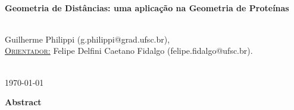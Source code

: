 \documentclass[a4paper,12pt]{article}
\begin{document}
\begin{titlepage}
		
		
		\HRule \\[0.4cm]
		{ \LARGE \bfseries \textbf{Geometria de Distâncias: uma aplicação na Geometria de Proteínas}} \\ [0.4cm] %
		\HRule \\[2.5cm]
		
		
		\begin{minipage}{1\textwidth}
			\begin{center} \large
				Guilherme Philippi (g.philippi@grad.ufsc.br),
				\vspace{0.5cm}
				\\
				\underline{\textsc{Orientador:}} \vspace{0.2cm}
				Felipe Delfini Caetano Fidalgo (felipe.fidalgo@ufsc.br).
			\end{center}
		\end{minipage} \\[2cm]
		
		
		{\large \today} %
		
		
		\vfill %
		
	\end{titlepage}
	
	
	\newpage
	\tableofcontents
	\newpage
	
	\begin{center}
		\large
		\textbf{Abstract}
	\end{center}
	
\end{document}
